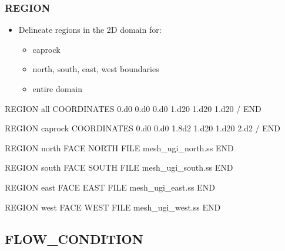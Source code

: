 \documentclass{beamer}
\begin{document}
\begin{frame}\frametitle{REGION}

\begin{itemize}
  \item Delineate regions in the 2D domain for:
  \begin{itemize}
    \item caprock
    \item north, south, east, west boundaries
    \item entire domain
  \end{itemize}
\end{itemize}

\begin{semiverbatim}
REGION all
  COORDINATES
    0.d0    0.d0    0.d0
    1.d20   1.d20   1.d20
  /
END
\newpage

REGION caprock
  COORDINATES
    0.d0 0.d0 1.8d2
    1.d20 1.d20 2.d2
  /
END

\newpage

REGION north
  FACE NORTH
  FILE mesh_ugi_north.ss
END

REGION south
  FACE SOUTH
  FILE mesh_ugi_south.ss
END

\newpage
REGION east
  FACE EAST
  FILE mesh_ugi_east.ss
END

REGION west
  FACE WEST
  FILE mesh_ugi_west.ss
END

\end{semiverbatim}

\end{frame}

\subsection{FLOW\_CONDITION}
\end{document}
